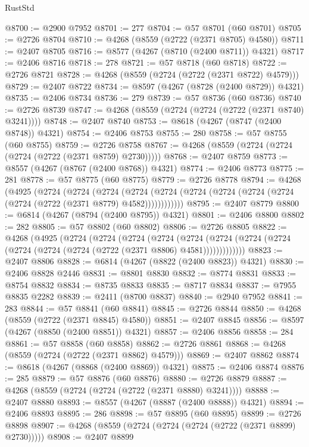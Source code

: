 \begin{lexlean}{RustStd}
\begin{coremodule}
@8700 := @2900 @7952
@8701 := 277
@8704 := @57 @8701 (@60 @8701)
@8705 := @2726 @8704
@8710 := @4268 (@8559 (@2722 (@2371 @8705) @4580))
@8711 := @2407 @8705
@8716 := @8577 (@4267 (@8710 (@2400 @8711)) @4321)
@8717 := @2406 @8716
@8718 := 278
@8721 := @57 @8718 (@60 @8718)
@8722 := @2726 @8721
@8728 := @4268 (@8559 (@2724 (@2722 (@2371 @8722) @4579)))
@8729 := @2407 @8722
@8734 := @8597 (@4267 (@8728 (@2400 @8729)) @4321)
@8735 := @2406 @8734
@8736 := 279
@8739 := @57 @8736 (@60 @8736)
@8740 := @2726 @8739
@8747 := @4268 (@8559 (@2724 (@2724 (@2722 (@2371 @8740) @3241))))
@8748 := @2407 @8740
@8753 := @8618 (@4267 (@8747 (@2400 @8748)) @4321)
@8754 := @2406 @8753
@8755 := 280
@8758 := @57 @8755 (@60 @8755)
@8759 := @2726 @8758
@8767 := @4268 (@8559 (@2724 (@2724 (@2724 (@2722 (@2371 @8759) @2730)))))
@8768 := @2407 @8759
@8773 := @8557 (@4267 (@8767 (@2400 @8768)) @4321)
@8774 := @2406 @8773
@8775 := 281
@8778 := @57 @8775 (@60 @8775)
@8779 := @2726 @8778
@8794 := @4268
    (@4925
      (@2724
        (@2724
          (@2724
            (@2724 (@2724 (@2724 (@2724 (@2724 (@2724 (@2724 (@2722 (@2371 @8779) @4582))))))))))))
@8795 := @2407 @8779
@8800 := @6814 (@4267 (@8794 (@2400 @8795)) @4321)
@8801 := @2406 @8800
@8802 := 282
@8805 := @57 @8802 (@60 @8802)
@8806 := @2726 @8805
@8822 := @4268
    (@4925
      (@2724
        (@2724
          (@2724
            (@2724
              (@2724
                (@2724 (@2724 (@2724 (@2724 (@2724 (@2724 (@2722 (@2371 @8806) @4581)))))))))))))
@8823 := @2407 @8806
@8828 := @6814 (@4267 (@8822 (@2400 @8823)) @4321)
@8830 := @2406 @8828 @2446
@8831 := @8801 @8830
@8832 := @8774 @8831
@8833 := @8754 @8832
@8834 := @8735 @8833
@8835 := @8717 @8834
@8837 := @7955 @8835 @2282
@8839 := @2411 (@8700 @8837)
@8840 := @2940 @7952
@8841 := 283
@8844 := @57 @8841 (@60 @8841)
@8845 := @2726 @8844
@8850 := @4268 (@8559 (@2722 (@2371 @8845) @4580))
@8851 := @2407 @8845
@8856 := @8597 (@4267 (@8850 (@2400 @8851)) @4321)
@8857 := @2406 @8856
@8858 := 284
@8861 := @57 @8858 (@60 @8858)
@8862 := @2726 @8861
@8868 := @4268 (@8559 (@2724 (@2722 (@2371 @8862) @4579)))
@8869 := @2407 @8862
@8874 := @8618 (@4267 (@8868 (@2400 @8869)) @4321)
@8875 := @2406 @8874
@8876 := 285
@8879 := @57 @8876 (@60 @8876)
@8880 := @2726 @8879
@8887 := @4268 (@8559 (@2724 (@2724 (@2722 (@2371 @8880) @3241))))
@8888 := @2407 @8880
@8893 := @8557 (@4267 (@8887 (@2400 @8888)) @4321)
@8894 := @2406 @8893
@8895 := 286
@8898 := @57 @8895 (@60 @8895)
@8899 := @2726 @8898
@8907 := @4268 (@8559 (@2724 (@2724 (@2724 (@2722 (@2371 @8899) @2730)))))
@8908 := @2407 @8899

\end{coremodule}
\end{lexlean}
